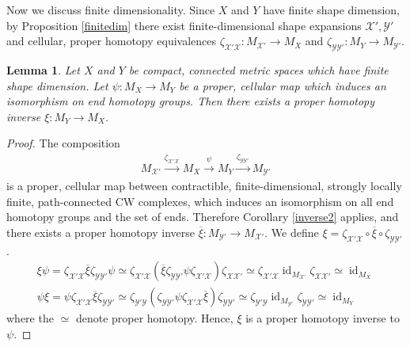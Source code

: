 \documentclass[a4paper,11pt]{article}
\theoremstyle{definition}
\theoremstyle{plain}
\newtheorem{lemma}[definition]{Lemma}
\theoremstyle{remark}
\DeclareMathOperator{\id}{id}
\begin{document}
{Now we discuss finite dimensionality. Since $X$ and $Y$ have finite shape dimension, by Proposition \ref{finitedim} there exist finite-dimensional shape expansions $\mathcal{X}',\mathcal{Y}'$ and cellular, proper homotopy equivalences $\zeta_{\mathcal{X'}\mathcal{X}}: M_{\mathcal{X}'}\rightarrow M_{X}$ and $\zeta_{\mathcal{Y}\mathcal{Y}'}: M_{Y}\rightarrow M_{\mathcal{Y}'}$. 

\begin{lemma} \label{weakimpliesphe} Let $X$ and $Y$ be compact, connected metric spaces which have finite shape dimension. Let $\psi: M_{X}\rightarrow M_{Y}$ be a proper, cellular map which induces an isomorphism on end homotopy groups. Then there exists a proper homotopy inverse $\xi: M_{Y}\rightarrow M_{X}$. 
\end{lemma}

\begin{proof} The composition
\begin{align*}
M_{\mathcal{X}'}\xrightarrow{\zeta_{\mathcal{X'}\mathcal{X}}} M_{X}\xrightarrow{\psi} M_{Y} \xrightarrow{\zeta_{\mathcal{Y}\mathcal{Y'}}} M_{\mathcal{Y}'}
\end{align*}
is a proper, cellular map between contractible, finite-dimensional, strongly locally finite, path-connected CW complexes, which induces an isomorphism on all end homotopy groups and the set of ends. Therefore Corollary \ref{inverse2} applies, and there exists a proper homotopy inverse $\overline{\xi}:M_{\mathcal{Y}'}\rightarrow M_{\mathcal{X'}}$. We define $\xi = \zeta_{\mathcal{X}' \mathcal{X}} \circ \overline{\xi} \circ \zeta_{\mathcal{Y} \mathcal{Y'}}$. 
\begin{align*}
\xi \psi = \zeta_{\mathcal{X}' \mathcal{X}}  \overline{\xi} \zeta_{\mathcal{Y} \mathcal{Y'}} \psi \simeq \zeta_{\mathcal{X}' \mathcal{X}} ( \overline{\xi}  \zeta_{\mathcal{Y} \mathcal{Y'}} \psi \zeta_{\mathcal{X'}\mathcal{X}}) \zeta_{\mathcal{X}\mathcal{X'}} \simeq \zeta_{\mathcal{X}' \mathcal{X}} \id_{M_{\mathcal{X}'}} \zeta_{\mathcal{X}\mathcal{X}'} \simeq \id_{M_{X}}\\
\psi \xi =  \psi \zeta_{\mathcal{X}' \mathcal{X}}  \overline{\xi}  \zeta_{\mathcal{Y} \mathcal{Y'}} \simeq \zeta_{\mathcal{Y}' \mathcal{Y}}(\zeta_{\mathcal{Y}\mathcal{Y}'} \psi \zeta_{\mathcal {X}' \mathcal{X}} \overline{\xi}) \zeta_{\mathcal{Y} \mathcal{Y}'} \simeq \zeta_{\mathcal{Y}'\mathcal{Y}} \id_{M_{\mathcal{Y}'}} \zeta_{\mathcal{Y}\mathcal{Y}'} \simeq \id_{M_{Y}}
\end{align*}
where the $\simeq$ denote proper homotopy. Hence, $\xi$ is a proper homotopy inverse to $\psi$. 
\end{proof}




}
\end{document}
